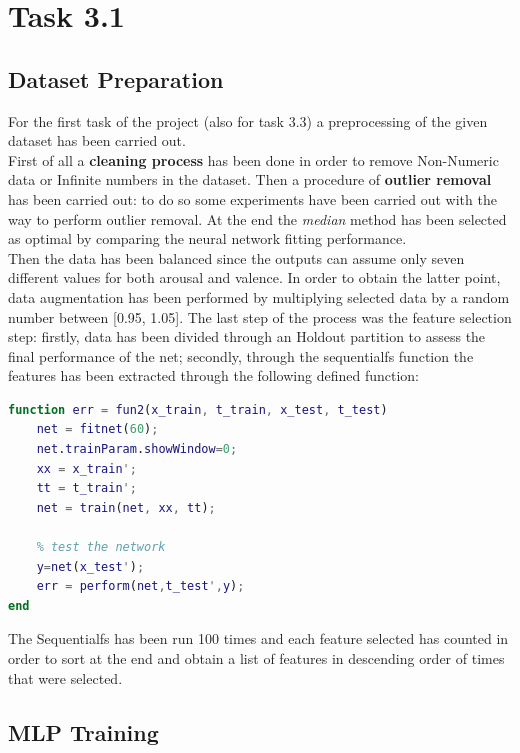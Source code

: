 \section{Task 3.1}
\subsection{Dataset Preparation}
For the first task of the project (also for task 3.3) a preprocessing of the given dataset has been carried out.\\
First of all a \textbf{cleaning process} has been done in order to remove Non-Numeric data or Infinite numbers in the dataset.
Then a procedure of \textbf{outlier removal} has been carried out: to do so some experiments have been carried out with the way to perform outlier removal. At the end the \textit{median} method has been selected as optimal by comparing the neural network fitting performance. \\
Then the data has been balanced since the outputs can assume only seven different values for both arousal and valence. In order to obtain the latter point, data augmentation has been performed by multiplying selected data by a random number between [0.95, 1.05].
The last step of the process was the feature selection step: firstly, data has been divided through an Holdout partition to assess the final performance of the net; secondly, through the sequentialfs function the features has been extracted through the following defined function:


\begin{lstlisting}[language=Matlab]
function err = fun2(x_train, t_train, x_test, t_test)
	net = fitnet(60);
	net.trainParam.showWindow=0;
	xx = x_train';
	tt = t_train';
	net = train(net, xx, tt);
	
	% test the network 
	y=net(x_test'); 
	err = perform(net,t_test',y);
end
\end{lstlisting}

The Sequentialfs has been run 100 times and each feature selected has counted in order to sort at the end and obtain a list of features in descending order of times that were selected.
 
\subsection{MLP Training}

